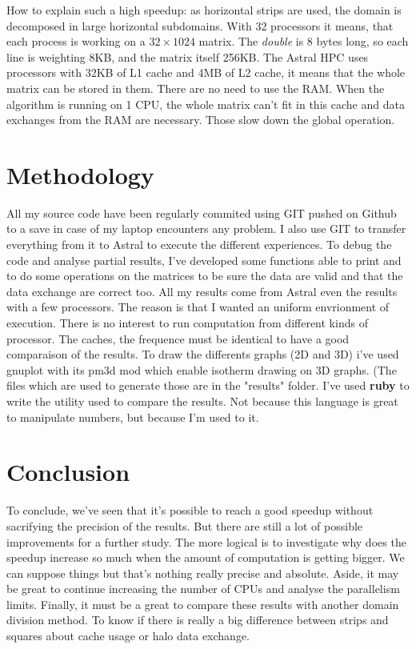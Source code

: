 \documentclass[a4paper,11pt]{article}
\begin{document}
\vspace{1em}
How to explain such a high speedup: as horizontal strips are used, the domain is decomposed in large horizontal subdomains.
With 32 processors it means, that each process is working on a $32\times1024$ matrix. The \textit{double} is 8 bytes long,
so each line is weighting 8KB, and the matrix itself 256KB. The Astral HPC uses processors with 32KB of L1 cache and 4MB of
L2 cache, it means that the whole matrix can be stored in them. There are no need to use the RAM. When the algorithm
is running on 1 CPU, the whole matrix can't fit in this cache and data exchanges from the RAM are necessary. Those slow down
the global operation.

\section{Methodology}

All my source code have been regularly commited using GIT pushed on Github to a save in case of my laptop encounters any problem.
I also use GIT to transfer everything from it to Astral to execute the different experiences. To debug the code and analyse
partial results, I've developed some functions able to print and to do some operations on the matrices to be sure the data
are valid and that the data exchange are correct too.
All my results come from Astral even the results with a few processors. The reason is that I wanted an uniform envrionment
of execution. There is no interest to run computation from different kinds of processor. The caches, the frequence must be identical
to have a good comparaison of the results.
To draw the differents graphs (2D and 3D) i've used gnuplot with its pm3d mod which enable isotherm drawing on 3D graphs. (The
files which are used to generate those are in the "results" folder. I've used \textbf{ruby} to write the utility used to
compare the results. Not because this language is great to manipulate numbers, but because I'm used to it.

\section*{Conclusion}

To conclude, we've seen that it's possible to reach a good speedup without sacrifying the precision of the results. But there
are still a lot of possible improvements for a further study. The more logical is to investigate why does the speedup increase
so much when the amount of computation is getting bigger. We can suppose things but that's nothing really precise and absolute.
Aside, it may be great to continue increasing the number of CPUs and analyse the parallelism limits. Finally, it must be
a great to compare these results with another domain division method. To know if there is really a big difference between strips
and squares about cache usage or halo data exchange.
\end{document}
